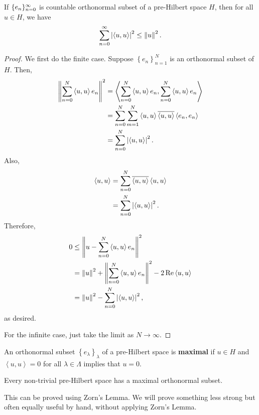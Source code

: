 \documentclass[a4paper]{article}
\renewcommand{\braket}[2]{\left\langle #1, #1 \right\rangle}
\begin{document}
\begin{thm}[Bessel]
If $\{ e_n \}_{n=0}^\infty$ is countable orthonormal subset 
of a pre-Hilbert space $H$, then for all 
$u \in H$, we have 
\[
\suminfn \abs{\braket{u}{e_n}}^2 \leq \norm{u}^2.
\]
\end{thm}

\begin{proof}
  We first do the finite case. Suppose $\left\{ e_n \right\}
  _{n=1}^N$ is an orthonormal subset of $H$. Then, 
  \[
  \begin{aligned}
  \norm{\sum_{n=0}^N \braket{u}{e_n} e_n}^2 
  &= \braket{\sum_{n=0}^N \braket{u}{e_n} e_n }{\sum_{n=0}^N \braket{u}{e_n} e_n} \\
  &= \sum_{n=0}^N 
  \sum_{m=1}^N \braket{u}{e_n} \bar{\braket{u}{e_m}} \braket{e_n}{e_m} \\
  &= \sum_{n=0}^N \abs{\braket{u}{e_n}}^2.
  \end{aligned}
  \]
  Also, 
  \[
  \begin{aligned}
  \braket{u}{\sum_{n=0}^N \braket{u}{e_n}e_n} 
  &= \sum_{n=0}^N \bar{\braket{u}{e_n}} \braket{u}{e_n} \\
  &= \sum_{n=0}^N \abs{\braket{u}{e_n}}^2.
  \end{aligned}
  \]
  Therefore, 
  \[
  \begin{aligned}
  0 
  &\leq \norm{u - \sum_{n=0}^N \braket{u}{e_n}e_n}^2 \\
  &= \norm{u}^2 + \norm{\sum_{n=0}^N \braket{u}{e_n}e_n}^2 
  - 2 \Re \braket{u}{\sum_{n=0}^N \braket{u}{e_n}e_n} \\
  &= \norm{u}^2 - \sum_{n=0}^N \abs{\braket{u}{e_n}}^2,
  \end{aligned}
  \]
  as desired.

  For the infinite case, just take the limit as  
  $N \to \infty$.
\end{proof}

\begin{defi}
  An orthonormal subset $\left\{ e_\lambda \right\}_\lambda$
  of a pre-Hilbert space is \textbf{maximal} if $u \in H$ 
  and $\braket{u}{e_\lambda} = 0$ for all $\lambda \in \Lambda$
  implies that $u = 0$.
\end{defi}

\begin{thm}
  Every non-trivial pre-Hilbert space has a maximal 
  orthonormal subset.
\end{thm}

This can be proved using Zorn's Lemma. We will prove 
something less strong but often equally useful by hand, 
without applying Zorn's Lemma.
\end{document}
